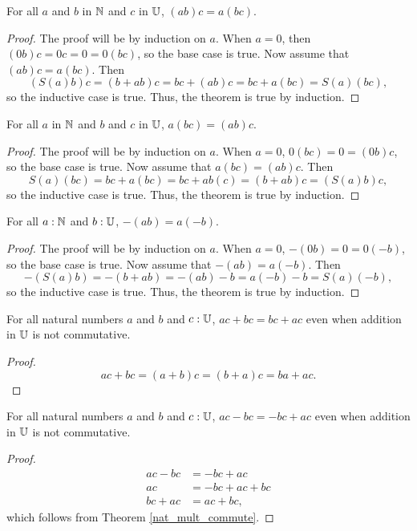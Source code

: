 \documentclass[../math.tex]{subfiles}
\begin{document}
\begin{theorem}
    For all $a$ and $b$ in $\mathbb{N}$ and $c$ in $\mathbb{U}$, $(ab)c = a(bc)$.
\end{theorem}
\begin{proof}
    The proof will be by induction on $a$.  When $a = 0$, then $(0b)c = 0c = 0 =
    0(bc)$, so the base case is true.  Now assume that $(ab)c = a(bc)$.
    Then
    \[
        (S(a)b)c = (b + ab)c = bc + (ab)c = bc + a(bc) = S(a)(bc),
    \]
    so the inductive case is true.  Thus, the theorem is true by induction.
\end{proof}

\begin{theorem}
    For all $a$ in $\mathbb{N}$ and $b$ and $c$ in $\mathbb{U}$, $a(bc) = (ab)c$.
\end{theorem}
\begin{proof}
    The proof will be by induction on $a$.  When $a = 0$, $0(bc) = 0 = (0b)c$,
    so the base case is true.  Now assume that $a(bc) = (ab)c$.  Then
    \[
        S(a)(bc) = bc + a(bc) = bc + ab(c) = (b + ab)c = (S(a)b)c,
    \]
    so the inductive case is true.  Thus, the theorem is true by induction.
\end{proof}

\begin{theorem}
    For all $a : \mathbb{N}$ and $b : \mathbb{U}$, $-(ab) = a(-b)$.
\end{theorem}
\begin{proof}
    The proof will be by induction on $a$.  When $a = 0$, $-(0b) = 0 = 0(-b)$,
    so the base case is true.  Now assume that $-(ab) = a(-b)$.  Then
    \[
        -(S(a)b) = -(b + ab) = -(ab) - b = a(-b) - b = S(a)(-b),
    \]
    so the inductive case is true.  Thus, the theorem is true by induction.
\end{proof}

\begin{theorem} \label{nat_mult_commute}
    For all natural numbers $a$ and $b$ and $c : \mathbb{U}$, $ac + bc = bc + ac$ even
    when addition in $\mathbb{U}$ is not commutative.
\end{theorem}
\begin{proof}
    \[
        ac + bc = (a + b)c = (b + a)c = ba + ac.
    \]
\end{proof}

\begin{theorem} \label{nat_mult_commute_neg}
    For all natural numbers $a$ and $b$ and $c : \mathbb{U}$, $ac - bc = -bc + ac$ even
    when addition in $\mathbb{U}$ is not commutative.
\end{theorem}
\begin{proof}
    \begin{align*}
        ac - bc &= -bc + ac \\
        ac &= -bc + ac + bc \\
        bc + ac &= ac + bc,
    \end{align*}
    which follows from Theorem \ref{nat_mult_commute}.
\end{proof}
\end{document}
